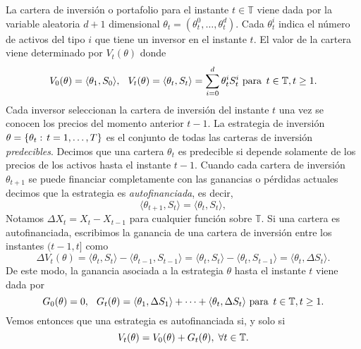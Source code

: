 La cartera de inversión o portafolio para el instante $ t \in \mathbb{T} $ viene dada por la variable aleatoria $ d+1 $ dimensional $ \theta_t = (\theta_t^0,\dots,\theta_t^d) $. Cada $ \theta_t^i $ indica el número de activos del tipo $ i $ que tiene un inversor en el instante $ t $. El valor de la cartera viene determinado por $ V_t(\theta) $ donde
\[
V_0(\theta) = \langle \theta_1 , S_0\rangle, \hspace{2.5mm} V_t(\theta) = \langle \theta_t , S_t\rangle = \sum_{i=0}^{d} \theta_t^i S_t^i \text{ para } \hspace{0.5mm} t \in \mathbb{T}, t \geq 1.
\]
Cada inversor seleccionan la cartera de inversión del instante $ t $ una vez se conocen los precios del momento anterior $ t-1 $. La estrategia de inversión $ \theta = \{\theta_t: \hspace{0.5mm}t=1,\dots,T\} $ es el conjunto de todas las carteras de inversión \textit{predecibles}. Decimos que una cartera $ \theta_{t} $ es predecible si depende solamente de los precios de los activos hasta el instante $ t-1 $. Cuando cada cartera de inversión $ \theta_{t+1} $ se puede financiar completamente con las ganancias o pérdidas actuales decimos que la estrategia es \textit{autofinanciada}, es decir, 
\begin{equation*}\label{selfinance}
\langle \theta_{t+1}, S_t \rangle = \langle \theta_{t}, S_t \rangle,
\end{equation*} Notamos $ \Delta X_t = X_t - X_{t-1} $ para cualquier función sobre $ \mathbb{T} $. Si una cartera es autofinanciada, escribimos la ganancia de una cartera de inversión entre los instantes $ (t-1,t] $ como 
\[
\Delta V_t(\theta) = \langle\theta_t, S_t \rangle - \langle\theta_{t-1}, S_{t-1}\rangle = \langle\theta_t, S_t \rangle - \langle\theta_{t}, S_{t-1}\rangle = \langle\theta_{t}, \Delta S_{t}\rangle.
\]
De este modo, la ganancia asociada a la estrategia $ \theta $ hasta el instante $ t $ viene dada por
\[
G_0(\theta) = 0, \hspace{2.5mm} G_t(\theta) = \langle\theta_{1}, \Delta S_{1}\rangle + \cdots + \langle\theta_{t}, \Delta S_{t}\rangle \text{ para } \hspace{0.5mm} t \in \mathbb{T}, t \geq 1.
\]
Vemos entonces que una estrategia es autofinanciada si, y solo si
\begin{equation}\label{selfinifonlyif}
V_t(\theta) = V_0(\theta) + G_t(\theta), \hspace{1mm} \forall t \in \mathbb{T}.
\end{equation}

